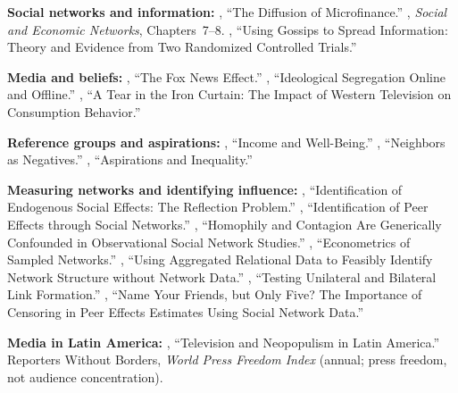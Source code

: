 \documentclass[../structural_economics_book.tex]{subfiles}
\begin{document}
\textbf{Social networks and information:} \citet{banerjee2013diffusion}, ``The Diffusion of Microfinance.'' \citet{jackson2008social}, \textit{Social and Economic Networks}, Chapters~7--8. \citet{banerjee2019using}, ``Using Gossips to Spread Information: Theory and Evidence from Two Randomized Controlled Trials.''

\textbf{Media and beliefs:} \citet{dellavigna2007fox}, ``The Fox News Effect.'' \citet{gentzkow2011ideological}, ``Ideological Segregation Online and Offline.'' \citet{bursztyn2016tear}, ``A Tear in the Iron Curtain: The Impact of Western Television on Consumption Behavior.''

\textbf{Reference groups and aspirations:} \citet{ferrericarbonell2005income}, ``Income and Well-Being.'' \citet{luttmer2005neighbors}, ``Neighbors as Negatives.'' \citet{genicot2017aspirations}, ``Aspirations and Inequality.''

\textbf{Measuring networks and identifying influence:} \citet{manski1993identification}, ``Identification of Endogenous Social Effects: The Reflection Problem.'' \citet*{bramoulle2009identification}, ``Identification of Peer Effects through Social Networks.'' \citet{shalizi2011homophily}, ``Homophily and Contagion Are Generically Confounded in Observational Social Network Studies.'' \citet{chandrasekhar2016econometrics}, ``Econometrics of Sampled Networks.'' \citet*{breza2020using}, ``Using Aggregated Relational Data to Feasibly Identify Network Structure without Network Data.'' \citet{comola2014testing}, ``Testing Unilateral and Bilateral Link Formation.'' \citet{griffith2022name}, ``Name Your Friends, but Only Five? The Importance of Censoring in Peer Effects Estimates Using Social Network Data.''

\textbf{Media in Latin America:} \citet{boas2005television}, ``Television and Neopopulism in Latin America.'' Reporters Without Borders, \textit{World Press Freedom Index} (annual; press freedom, not audience concentration).
\end{document}
